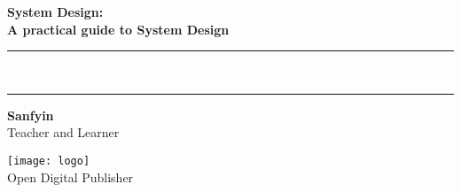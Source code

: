 
{}
{
\centering
\Huge\bfseries System Design:\\
 A practical guide to System Design\\[-4mm]
\color{red}  
 \rule{\linewidth}{1pt}\\[-6mm]
 \rule{\linewidth}{2pt}
}


\vskip3cm
{\noindent \LARGE \bfseries  Sanfyin}\\[5mm]

\noindent Teacher and Learner

\vfill 
\texttt{[image: logo]}\\[1mm]
Open Digital Publisher

\clearpage